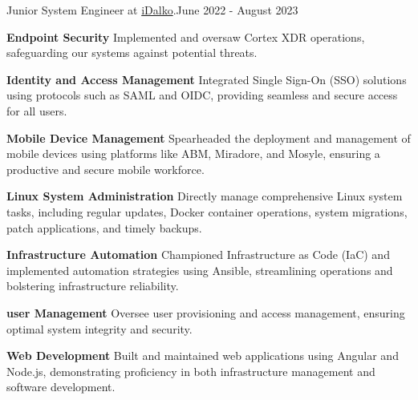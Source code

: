 Junior System Engineer at {\href{https://www.idalko.com}{iDalko}}.{\textcolor{mygrey}{\hspace*{\fill}June 2022 - August 2023}}
\vspace{.55em}
\begin{flushleft}
\par
\textbf{Endpoint Security}
Implemented and oversaw Cortex XDR operations, safeguarding our systems against potential threats.
\vspace{.55em}
\par
\textbf{Identity and Access Management}
Integrated Single Sign-On (SSO) solutions using protocols such as SAML and OIDC, providing seamless and secure access for all users.
\vspace{.55em}\par
\textbf{Mobile Device Management}
Spearheaded the deployment and management of mobile devices using platforms like ABM, Miradore, and Mosyle, ensuring a productive and secure mobile workforce.
\vspace{.55em}
\par
\textbf{Linux System Administration}
Directly manage comprehensive Linux system tasks, including regular updates, Docker container operations, system migrations, patch applications, and timely backups.
\vspace{.55em}
\par
\textbf{Infrastructure Automation}
Championed Infrastructure as Code (IaC) and implemented automation strategies using Ansible, streamlining operations and bolstering infrastructure reliability.
\vspace{.55em}
\par
\textbf{user Management}
Oversee user provisioning and access management, ensuring optimal system integrity and security.
\vspace{.55em}
\par
\textbf{Web Development}
Built and maintained web applications using Angular and Node.js, demonstrating proficiency in both infrastructure management and software development.
\vspace{.55em}
\end{flushleft}

